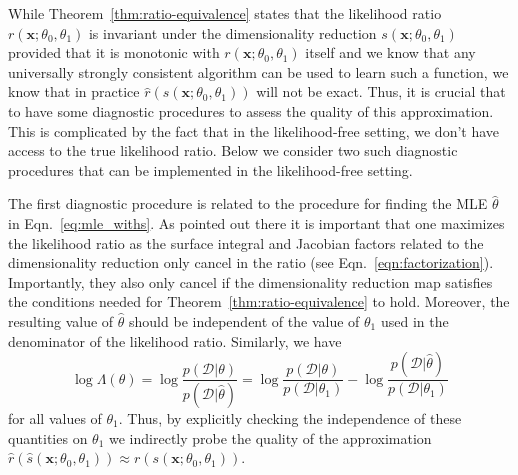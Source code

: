 \documentclass[12pt]{article}
\numberwithin{equation}{section}
\theoremstyle{plain}
\begin{document}
While Theorem~\ref{thm:ratio-equivalence} states that the likelihood ratio $r(\mathbf{x}; \theta_0, \theta_1)$ is
invariant under the dimensionality reduction $s(\mathbf{x}; \theta_0, \theta_1)$ provided that it is monotonic with
$r(\mathbf{x}; \theta_0, \theta_1)$ itself and we know that any universally strongly consistent algorithm can be
used to learn such a function, we know that in practice $\hat{r}(\hat{s}(\mathbf{x}; \theta_0, \theta_1))$ will not be exact.
Thus, it is crucial that to have some diagnostic procedures to assess the quality of this approximation.
This is complicated by the fact that in the likelihood-free setting, we don't have access to the true likelihood ratio.
Below we consider two such diagnostic procedures that can be implemented in the likelihood-free setting.

The first diagnostic procedure is related to the procedure for finding the MLE $\hat{\theta}$ in Eqn.~\ref{eq:mle_withs}. As pointed out there it is important that one maximizes the likelihood ratio as the surface integral and Jacobian factors related to the dimensionality reduction only cancel in the ratio (see Eqn.~\ref{eqn:factorization}). Importantly, they also only cancel if the dimensionality reduction map satisfies the conditions needed for Theorem~\ref{thm:ratio-equivalence} to hold. Moreover, the resulting value of $\hat{\theta}$ should be independent of the value of $\theta_1$ used in the denominator of the likelihood ratio. Similarly, we have
\begin{equation}
\log\Lambda(\theta) = \log \frac{p(\mathcal{D}|\theta)}{p(\mathcal{D}|\hat\theta)} = \log \frac{p(\mathcal{D}|\theta)}{p(\mathcal{D}|\theta_1)} -\log \frac{p(\mathcal{D}|\hat\theta)}{p(\mathcal{D}|\theta_1)}
\end{equation}
for all values of $\theta_1$. Thus, by explicitly checking the independence of these quantities on $\theta_1$ we indirectly probe the quality of the approximation $\hat{r}(\hat{s}(\mathbf{x}; \theta_0, \theta_1)) \approx {r}({s}(\mathbf{x}; \theta_0, \theta_1))$.
\end{document}
